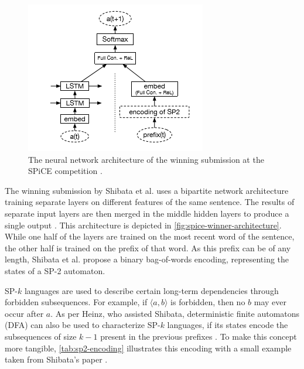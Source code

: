 \begin{figure}
    \centering
    \includegraphics[height=.5\textwidth]{gfx/spice-winner-architecture.png}
    \caption{The neural network architecture of the winning submission at the SPiCE competition \cite{shibata2016bipartite}.}
    \label{fig:spice-winner-architecture}
\end{figure}

The winning submission by Shibata et al. uses a bipartite network architecture training separate layers on different features of the same sentence. The results of separate input layers are then merged in the middle hidden layers to produce a single output \cite{shibata2016bipartite}. This architecture is depicted in \autoref{fig:spice-winner-architecture}.
While one half of the layers are trained on the most recent word of the sentence, the other half is trained on the prefix of that word. As this prefix can be of any length, Shibata et al. propose a binary bag-of-words encoding, representing the states of a SP-2 automaton.

SP-$k$ languages are used to describe certain long-term dependencies through forbidden subsequences. For example, if $\langle a,b \rangle$ is forbidden, then no $b$ may ever occur after $a$. As per Heinz, who assisted Shibata, deterministic finite automatons (DFA) can also be used to characterize SP-$k$ languages, if its states encode the subsequences of size $k-1$  present in the previous prefixes \cite{heinz2010estimatingSP}. To make this concept more tangible, \autoref{tab:sp2-encoding} illustrates this encoding with a small example taken from Shibata's paper \cite{shibata2016bipartite}.\\

